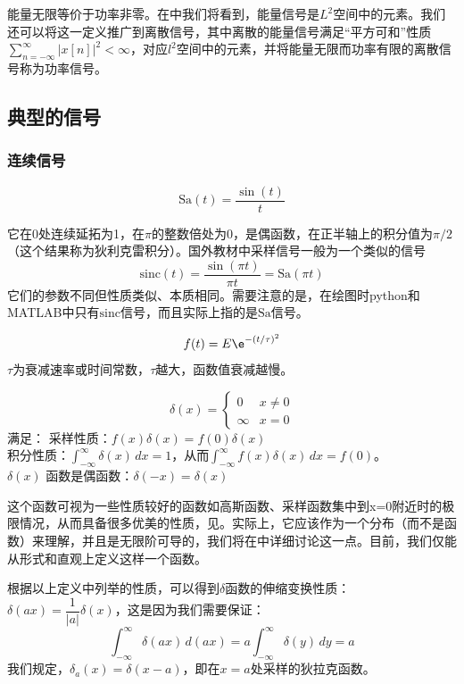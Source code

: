 能量无限等价于功率非零。在中我们将看到，能量信号是$L^2$空间中的元素。我们还可以将这一定义推广到离散信号，其中离散的能量信号满足“平方可和”性质$\sum_{n=-\infty}^{\infty}|x[n]|^2<\infty$，对应$l^2$空间中的元素，并将能量无限而功率有限的离散信号称为功率信号。

\subsection{典型的信号}\label{sub:ordinary_signal}
\subsubsection{连续信号}
\begin{definition}[采样信号]\label{def:sinc}
    \[\mathrm{Sa}(t)=\frac{\sin(t)}{t}\]
\end{definition}
它在0处连续延拓为1，在$\pi$的整数倍处为0，是偶函数，在正半轴上的积分值为$\pi /2$（这个结果称为狄利克雷积分）。国外教材中采样信号一般为一个类似的信号
\[\mathrm{sinc}(t)=\frac{\sin(\pi t)}{\pi t}=\mathrm{Sa}(\pi t)\]
它们的参数不同但性质类似、本质相同。需要注意的是，在绘图时python和MATLAB中只有$\mathrm{sinc}$信号，而且实际上指的是$\mathrm{Sa}$信号。
\begin{definition}
    \[f(t)=E\e^{-\left(t/\tau\right)^2}\]
    $\tau$为衰减速率或时间常数，$\tau$越大，函数值衰减越慢。
\end{definition}
\begin{definition}\label{def:delta}
    $$\delta (x)=\begin{cases}
            0      & x\neq 0 \\
            \infty & x=0
        \end{cases}$$满足： 采样性质：$f(x)\delta (x)=f(0)\delta (x)$\\
     积分性质：$\int_{-\infty}^{\infty}\delta (x)\,dx=1$，从而$\int_{-\infty}^{\infty}f(x)\delta (x)\,dx=f(0)$。\\
     $\delta(x)$ 函数是偶函数：$\delta (-x)=\delta (x)$
\end{definition}
这个函数可视为一些性质较好的函数如高斯函数、采样函数集中到x=0附近时的极限情况，从而具备很多优美的性质，见。实际上，它应该作为一个分布（而不是函数）来理解，并且是无限阶可导的，我们将在中详细讨论这一点。目前，我们仅能从形式和直观上定义这样一个函数。

根据以上定义中列举的性质，可以得到$\delta$函数的伸缩变换性质：$\delta(ax)=\dfrac{1}{|a|}\delta(x)$，这是因为我们需要保证：
\[\int_{-\infty}^{\infty}\delta(ax)\,d(ax)=a\int_{-\infty}^{\infty}\delta(y)\,dy=a\]
我们规定，$\delta_a(x)=\delta (x-a)$，即在$x=a$处采样的狄拉克函数。

